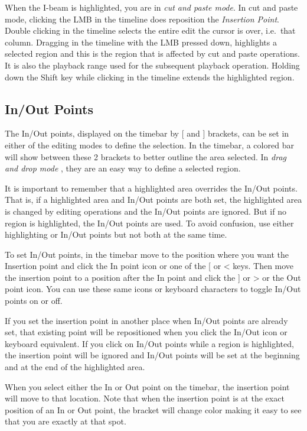 When the I-beam is highlighted, you are in \emph{cut and paste mode}.
In cut and paste mode, clicking the LMB in the timeline does reposition the \textit{Insertion Point}. 
Double clicking in the timeline selects the entire edit the cursor is over, i.e.\ that column. 
Dragging in the timeline with the LMB pressed down, highlights a selected region and this is the region that is affected by cut
and paste operations.  It is also the playback range used for the subsequent playback operation. 
Holding down the Shift key while clicking in the timeline extends the highlighted region.

\subsection{In/Out Points}%
\label{sub:in_out_points}

The In/Out points, displayed on the timebar  by [ and ] brackets,  can be set in either of the editing modes to define the selection.
In the timebar, a colored bar will show between these 2 brackets to better outline the area selected.
In \emph{drag and drop mode} , they are an easy way to define a selected region.

It is important to remember that a highlighted area overrides the In/Out points. That is, if a highlighted area and In/Out points are both set, the highlighted area is changed by editing operations and the In/Out points are ignored. 
But if no region is highlighted, the In/Out points are used. 
To avoid confusion, use either highlighting or In/Out points but not both at the same time.

To set In/Out points, in the timebar move to the position where you want the Insertion point  and click the In
point icon or one of the [ or < keys.
Then move the insertion point to a position after the In point and click the ] or > or the Out point icon. 
You can use these same icons or keyboard characters to toggle In/Out points on or off.

If you set the insertion point in another place when In/Out points are already set, that existing point will be
repositioned when you click the In/Out icon or keyboard equivalent. 
If you click on In/Out points while a region is highlighted, the insertion point will be ignored and In/Out points will be set at the beginning and at the end of the highlighted area.

When you select either the In or Out point on the timebar, the insertion point will move to that location. Note that when the insertion point is at the exact position of an In or Out point, the bracket will change
color making it easy to see that you are exactly at that spot.
 
